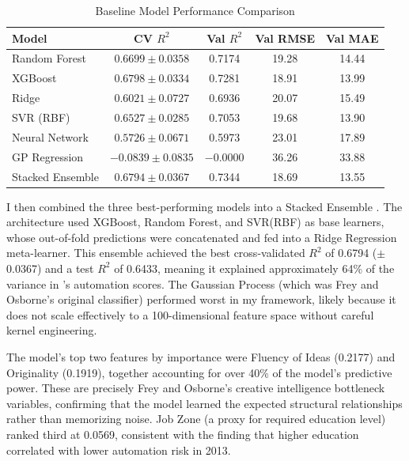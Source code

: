 \begin{table}[htbp]
\centering
\caption{Baseline Model Performance Comparison}
\label{tab:baseline}
\begin{tabular}{lcccc}
\toprule
Model & CV $R^2$ & Val $R^2$ & Val RMSE & Val MAE \\
\midrule
Random Forest     & $0.6699 \pm 0.0358$ & 0.7174 & 19.28 & 14.44 \\
XGBoost           & $0.6798 \pm 0.0334$ & 0.7281 & 18.91 & 13.99 \\
Ridge             & $0.6021 \pm 0.0727$ & 0.6936 & 20.07 & 15.49 \\
SVR (RBF)         & $0.6527 \pm 0.0285$ & 0.7053 & 19.68 & 13.90 \\
Neural Network    & $0.5726 \pm 0.0671$ & 0.5973 & 23.01 & 17.89 \\
GP Regression     & $-0.0839 \pm 0.0835$ & $-0.0000$ & 36.26 & 33.88 \\
\midrule
Stacked Ensemble  & $0.6794 \pm 0.0367$ & 0.7344 & 18.69 & 13.55 \\
\bottomrule
\end{tabular}
\end{table}

I then combined the three best-performing models into a Stacked Ensemble \citep{Wolpert_1992}. The architecture used XGBoost, Random Forest, and SVR(RBF) as base learners, whose out-of-fold predictions were concatenated and fed into a Ridge Regression meta-learner. This ensemble achieved the best cross-validated $R^2$ of 0.6794 ($\pm$0.0367) and a test $R^2$ of 0.6433, meaning it explained approximately 64\% of the variance in \citet{Frey_Osborne_2017}'s automation scores. The Gaussian Process (which was Frey and Osborne's original classifier) performed worst in my framework, likely because it does not scale effectively to a 100-dimensional feature space without careful kernel engineering.

The model's top two features by importance were Fluency of Ideas (0.2177) and Originality (0.1919), together accounting for over 40\% of the model's predictive power. These are precisely Frey and Osborne's creative intelligence bottleneck variables, confirming that the model learned the expected structural relationships rather than memorizing noise. Job Zone (a proxy for required education level) ranked third at 0.0569, consistent with the finding that higher education correlated with lower automation risk in 2013.

